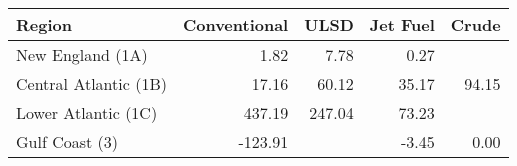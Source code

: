 \begin{tabular}{lrrrr}
  \hline
Region & Conventional & ULSD & Jet Fuel & Crude \\ 
  \hline
New England (1A) & 1.82 & 7.78 & 0.27 &  \\ 
  Central Atlantic (1B) & 17.16 & 60.12 & 35.17 & 94.15 \\ 
  Lower Atlantic (1C) & 437.19 & 247.04 & 73.23 &  \\ 
  Gulf Coast (3) & -123.91 &  & -3.45 & 0.00 \\ 
   \hline
\end{tabular}
